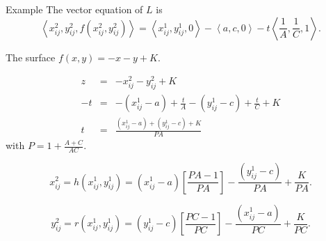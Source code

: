 \documentclass[a4paper,10pt]{article}
\begin{document}
\begin{section}{Example}
The vector equation of $L$ is
\begin{equation}
\left <x_{ij}^2,y_{ij}^2,f(x_{ij}^2,y_{ij}^2) \right > = \left < x_{ij}^1, y_{ij}^1, 0\right > - \left < a, c, 0\right > - t \left < \frac{1}{A},\frac{1}{C},1\right >.  
\end{equation}

The surface $f(x,y) = -x - y + K$.

\begin{eqnarray}
z &=& - x_{ij}^2 - y_{ij}^2 + K\\
-t &=& -(x_{ij}^1 - a) + \frac{t}{A} - (y_{ij}^1 - c) + \frac{t}{C} + K\\
t &=& \frac{(x_{ij}^1 - a) + (y_{ij}^1 - c) + K}{PA}
\end{eqnarray}
with $P = 1 + \frac{A+C}{AC}$.

\begin{equation}
x_{ij}^2 = h(x_{ij}^1,y_{ij}^1) = (x_{ij}^1 - a)\left [ \frac{PA-1}{PA} \right ] - \frac{(y_{ij}^1 - c)}{PA} + \frac{K}{PA}.
\end{equation}

\begin{equation}
y_{ij}^2 = r(x_{ij}^1,y_{ij}^1) = (y_{ij}^1 - c)\left [ \frac{PC-1}{PC} \right ] - \frac{(x_{ij}^1 - a)}{PC} + \frac{K}{PC}.  
\end{equation}




 
\end{section}
\end{document}
